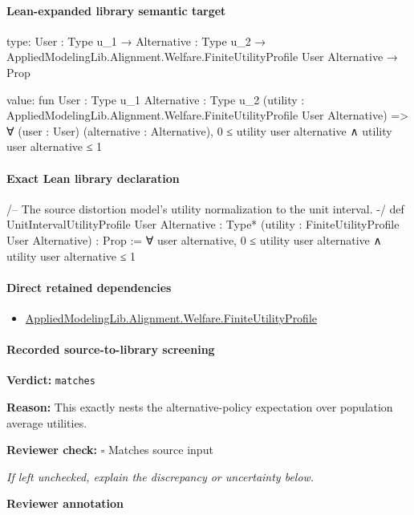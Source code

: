 \documentclass[10pt]{article}
\newcommand{\reviewerbox}{%
  \par\noindent\fbox{\parbox{0.96\linewidth}{\rule{0pt}{0.38in}}}\par
}
\newcommand{\reviewmatch}[1]{%
  \par\noindent\textbf{Reviewer check:} $\square$\; #1\par
  \noindent\emph{If left unchecked, explain the discrepancy or uncertainty below.}\par
}
\begin{document}
\paragraph{Lean-expanded library semantic target}
\begin{ReviewVerbatim}
type:
{User : Type u_1} →
  {Alternative : Type u_2} → AppliedModelingLib.Alignment.Welfare.FiniteUtilityProfile User Alternative → Prop

value:
fun {User : Type u_1} {Alternative : Type u_2}
    (utility : AppliedModelingLib.Alignment.Welfare.FiniteUtilityProfile User Alternative) =>
  ∀ (user : User) (alternative : Alternative), 0 ≤ utility user alternative ∧ utility user alternative ≤ 1
\end{ReviewVerbatim}

\paragraph{Exact Lean library declaration}
\begin{ReviewVerbatim}
/-- The source distortion model's utility normalization to the unit interval. -/
def UnitIntervalUtilityProfile {User Alternative : Type*}
    (utility : FiniteUtilityProfile User Alternative) : Prop :=
  ∀ user alternative, 0 ≤ utility user alternative ∧ utility user alternative ≤ 1
\end{ReviewVerbatim}

\paragraph{Direct retained dependencies}
\begin{itemize}\raggedright
\item \hyperlink{library-prerequisite-56c0734f8877ddbe}{Applied\allowbreak{}Modeling\allowbreak{}Lib.\allowbreak{}Alignment.\allowbreak{}Welfare.\allowbreak{}Finite\allowbreak{}Utility\allowbreak{}Profile}
\end{itemize}
\paragraph{Recorded source-to-library screening}
\textbf{Verdict:} \texttt{matches}
\\
{\raggedright
\textbf{Reason:} This exactly nests the alternative-\allowbreak{}policy expectation over population average utilities.\allowbreak{}
\par}
\reviewmatch{Matches source input}
\noindent\textbf{Reviewer annotation}\par
\reviewerbox
\clearpage
\hypertarget{library-prerequisite-15f4b442749deab2}{}
\end{document}
